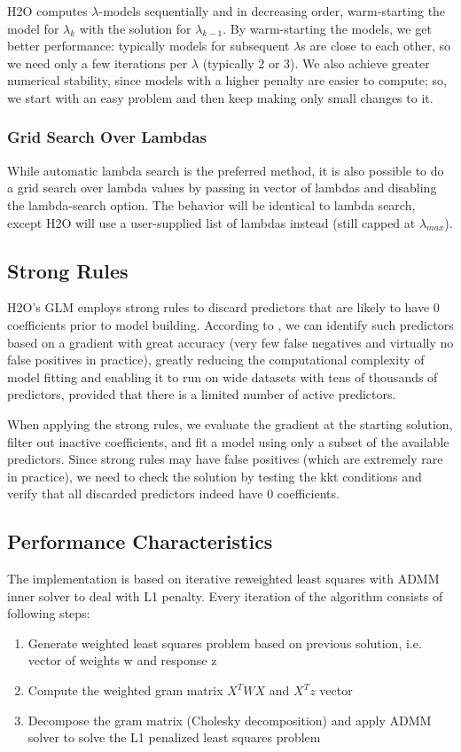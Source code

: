 \documentclass[11pt]{article}
\begin{document}
H2O computes $\lambda$-models sequentially and in decreasing order, warm-starting the model for $\lambda_k$ with the solution for $\lambda_{k-1}$. By warm-starting the models, we get better performance: typically models for subsequent $\lambda$s are close to each other, so we need only a few iterations per $\lambda$ (typically 2 or 3). We also achieve greater numerical stability, since models with a higher penalty are easier to compute; so, we start with an easy problem and then keep making only small changes to it.
    
\subsubsection{Grid Search Over Lambdas}
While automatic lambda search is the preferred method, it is also possible to do a grid search over lambda values by passing in vector of lambdas and disabling the lambda-search option. The behavior will be identical to lambda search, except H2O will use a user-supplied list of lambdas instead (still capped at $\lambda_{max}$).

\subsection{Strong Rules} %
H2O's GLM employs strong rules \cite{strong} to discard predictors that are likely to have 0 coefficients prior to model building. According to \cite{strong}, we can identify such predictors based on a gradient with great accuracy (very few false negatives and virtually no false positives in practice), greatly reducing the computational complexity of model fitting and enabling it to run on wide datasets with tens of thousands of predictors, provided that there is a limited number of active predictors. 

When applying the strong rules, we evaluate the gradient at the starting solution, filter out inactive coefficients, and fit a model using only a subset of the available predictors. Since strong rules may have false positives (which are extremely rare in practice), we need to check the solution by testing the kkt conditions and verify that all discarded predictors indeed have 0 coefficients.  

\subsection{Performance Characteristics}
The implementation is based on iterative reweighted least squares with ADMM \cite{admm} inner solver to deal with L1 penalty. Every iteration of the algorithm consists of following steps:
\begin{enumerate} 
\item Generate weighted least squares problem based on previous solution, i.e. vector of weights w and response z 
\item Compute the weighted gram matrix $X^TWX$ and $X^Tz$ vector
\item Decompose the gram matrix (Cholesky decomposition) and apply ADMM solver to solve the L1 penalized least squares problem
\end{enumerate}
\end{document}
